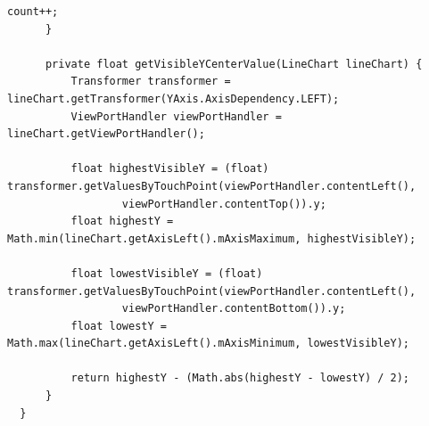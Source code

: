 \documentclass[dvipdfmx,autodetect-engine,titlepage]{jsarticle}
\begin{document}
\begin{lstlisting}[caption=MainActivity.jave,label=java]
          count++;
      }
  
      private float getVisibleYCenterValue(LineChart lineChart) {
          Transformer transformer = lineChart.getTransformer(YAxis.AxisDependency.LEFT);
          ViewPortHandler viewPortHandler = lineChart.getViewPortHandler();
  
          float highestVisibleY = (float) transformer.getValuesByTouchPoint(viewPortHandler.contentLeft(),
                  viewPortHandler.contentTop()).y;
          float highestY = Math.min(lineChart.getAxisLeft().mAxisMaximum, highestVisibleY);
  
          float lowestVisibleY = (float) transformer.getValuesByTouchPoint(viewPortHandler.contentLeft(),
                  viewPortHandler.contentBottom()).y;
          float lowestY = Math.max(lineChart.getAxisLeft().mAxisMinimum, lowestVisibleY);
  
          return highestY - (Math.abs(highestY - lowestY) / 2);
      }
  }
  
\end{lstlisting}
\end{document}
